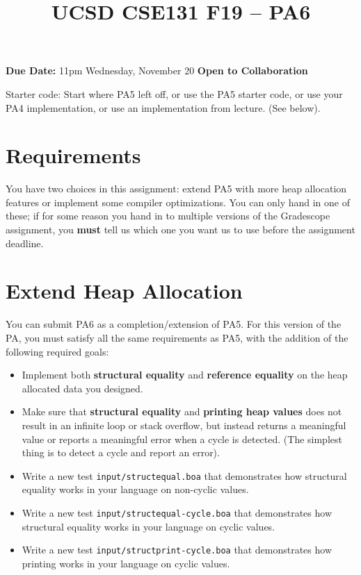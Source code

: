 \documentclass[10pt, oneside]{article}
\title{UCSD CSE131 F19 -- PA6}
\begin{document}
\maketitle 

{\bf Due Date:} 11pm Wednesday, November 20 \hspace{2em} {\bf Open to Collaboration}

Starter code: Start where PA5 left off, or use the PA5 starter code, or use
your PA4 implementation, or use an implementation from lecture. (See below).

\section*{Requirements}

You have two choices in this assignment: extend PA5 with more heap allocation
features or implement some compiler optimizations. You can only hand in one
of these; if for some reason you hand in to multiple versions of the
Gradescope assignment, you {\bf must} tell us which one you want us to use
before the assignment deadline.

\section*{Extend Heap Allocation}

You can submit PA6 as a completion/extension of PA5. For this version of the
PA, you must satisfy all the same requirements as PA5, with the addition of
the following required goals:

\begin{itemize}
\item Implement both {\bf structural equality} and {\bf reference equality}
on the heap allocated data you designed.
\item Make sure that {\bf structural equality} and {\bf printing heap values}
does not result in an infinite loop or stack overflow, but instead returns a
meaningful value or reports a meaningful error when a cycle is detected. (The
simplest thing is to detect a cycle and report an error).
\item Write a new test {\tt input/structequal.boa} that demonstrates how
structural equality works in your language on non-cyclic values.
\item Write a new test {\tt input/structequal-cycle.boa} that demonstrates how
structural equality works in your language on cyclic values.
\item Write a new test {\tt input/structprint-cycle.boa} that demonstrates how
printing works in your language on cyclic values.
\end{itemize}
\end{document}
